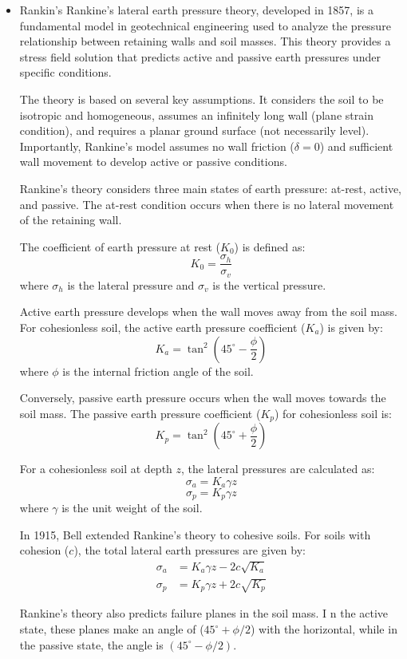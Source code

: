 \documentclass[xcolor=dvipsnames,10pt,hidelinks]{article}
\begin{document}
\begin{itemize}
\begin{itemize}
\item Rankin's
Rankine's lateral earth pressure theory, developed in 1857, is a fundamental model in geotechnical engineering used to analyze the pressure relationship between retaining walls and soil masses. This theory provides a stress field solution that predicts active and passive earth pressures under specific conditions.

The theory is based on several key assumptions.
It considers the soil to be isotropic and homogeneous, assumes an infinitely long wall (plane strain condition),
and requires a planar ground surface (not necessarily level).
Importantly, Rankine's model assumes no wall friction (\(\delta = 0\)) and sufficient wall movement to develop active or passive conditions.

Rankine's theory considers three main states of earth pressure: at-rest, active, and passive.
The at-rest condition occurs when there is no lateral movement of the retaining wall.

The coefficient of earth pressure at rest (\(K_0\)) is defined as:
$$ K_0 = \frac{\sigma_h}{\sigma_v} $$
where \(\sigma_{h}\) is the lateral pressure and \(\sigma_v\) is the vertical pressure.

Active earth pressure develops when the wall moves away from the soil mass.
For cohesionless soil, the active earth pressure coefficient (\(K_a\)) is given by:
$$ K_a = \tan^2(45^{\circ} - \frac{\phi}{2}) $$
where \(\phi\) is the internal friction angle of the soil.

Conversely, passive earth pressure occurs when the wall moves towards the soil mass.
The passive earth pressure coefficient (\(K_p\)) for cohesionless soil is:
$$ K_p = \tan^2(45^{\circ} + \frac{\phi}{2}) $$

For a cohesionless soil at depth \(z\), the lateral pressures are calculated as:
$$ \sigma_a = K_a \gamma z $$
$$ \sigma_p = K_p \gamma z $$
where \(\gamma\) is the unit weight of the soil.

In 1915, Bell extended Rankine's theory to cohesive soils.
For soils with cohesion (\(c\)), the total lateral earth pressures are given by:
\begin{align*}
 \sigma_a &= K_a \gamma z - 2c\sqrt{K_a} \\
 \sigma_p &= K_p \gamma z + 2c\sqrt{K_p}
\end{align*}

Rankine's theory also predicts failure planes in the soil mass. I
n the active state, these planes make an angle of (\(45^{\circ} + \phi/2\)) with the horizontal,
while in the passive state, the angle is \((45^{\circ} - \phi/2)\).


\end{itemize}
\end{itemize}
\end{document}
